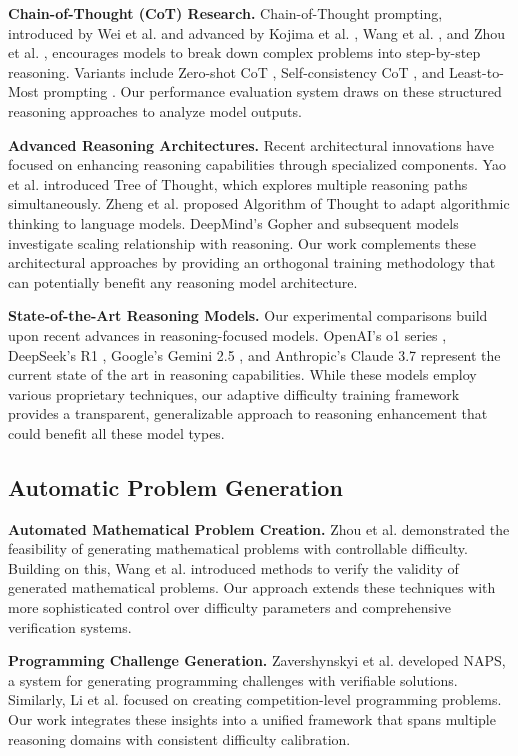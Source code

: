 \textbf{Chain-of-Thought (CoT) Research.} Chain-of-Thought prompting, introduced by Wei et al. \citep{wei2022chain} and advanced by Kojima et al. \citep{kojima2022large}, Wang et al. \citep{wang2022self,wang2023selfconsistency}, and Zhou et al. \citep{zhou2022least}, encourages models to break down complex problems into step-by-step reasoning. Variants include Zero-shot CoT \citep{kojima2022large}, Self-consistency CoT \citep{wang2022self}, and Least-to-Most prompting \citep{zhou2022least}. Our performance evaluation system draws on these structured reasoning approaches to analyze model outputs.

\textbf{Advanced Reasoning Architectures.} Recent architectural innovations have focused on enhancing reasoning capabilities through specialized components. Yao et al. \citep{yao2023tree} introduced Tree of Thought, which explores multiple reasoning paths simultaneously. Zheng et al. \citep{zheng2023algorithm} proposed Algorithm of Thought to adapt algorithmic thinking to language models. DeepMind's Gopher \citep{rae2021scaling} and subsequent models investigate scaling relationship with reasoning. Our work complements these architectural approaches by providing an orthogonal training methodology that can potentially benefit any reasoning model architecture.

\textbf{State-of-the-Art Reasoning Models.} Our experimental comparisons build upon recent advances in reasoning-focused models. OpenAI's o1 series \citep{openai2023gpt4}, DeepSeek's R1 \citep{deepseek2023r1}, Google's Gemini 2.5 \citep{google2023gemini}, and Anthropic's Claude 3.7 \citep{anthropic2023claude} represent the current state of the art in reasoning capabilities. While these models employ various proprietary techniques, our adaptive difficulty training framework provides a transparent, generalizable approach to reasoning enhancement that could benefit all these model types.

\subsection{Automatic Problem Generation}

\textbf{Automated Mathematical Problem Creation.} Zhou et al. \citep{zhou2020automatic} demonstrated the feasibility of generating mathematical problems with controllable difficulty. Building on this, Wang et al. \citep{wang2021automatic} introduced methods to verify the validity of generated mathematical problems. Our approach extends these techniques with more sophisticated control over difficulty parameters and comprehensive verification systems.

\textbf{Programming Challenge Generation.} Zavershynskyi et al. \citep{zavershynskyi2018naps} developed NAPS, a system for generating programming challenges with verifiable solutions. Similarly, Li et al. \citep{li2022competition} focused on creating competition-level programming problems. Our work integrates these insights into a unified framework that spans multiple reasoning domains with consistent difficulty calibration.
